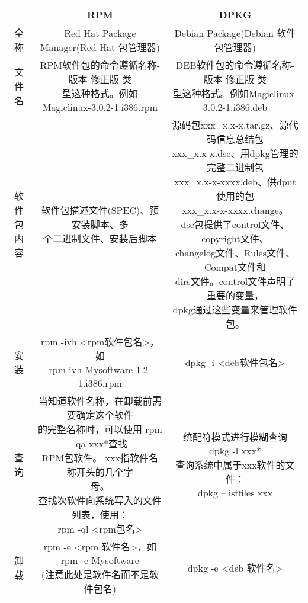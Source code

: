 \begin{center}
{\small
\begin{tabular}{c|c|c}
\hline
& RPM & DPKG\\
\hline
全称 & Red Hat Package Manager(Red Hat 包管理器)& Debian Package(Debian 软件包管理器)\\
\hline
文件名 &\tabincell{c}{RPM软件包的命令遵循名称-版本-修正版-类\\型这种格式。例如 Magiclinux-3.0.2-1.i386.rpm} & \tabincell{c}{DEB软件包的命令遵循名称-版本-修正版-类\\型这种格式。例如Magiclinux-3.0.2-1.i386.deb}\\
\hline
\tabincell{c}{软件包\\内容} & \tabincell{l}{软件包描述文件(SPEC)、预安装脚本、多\\个二进制文件、安装后脚本}&\tabincell{l}{源码包xxx\_x.x-x.tar.gz、源代码信息总结包\\xxx\_x.x-x.dsc、用dpkg管理的完整二进制包\\xxx\_x.x-x-xxxx.deb、供dput使用的包\\xxx\_x.x-x-xxxx.change。\\ dsc包提供了control文件、copyright文件、\\changelog文件、Rules文件、Compat文件和\\dirs文件。control文件声明了重要的变量，\\dpkg通过这些变量来管理软件包。}\\
\hline
安装 & \tabincell{l}{rpm -ivh <rpm软件包名>，如\\ rpm-ivh Mysoftware-1.2-1.i386.rpm} & dpkg -i <deb软件包名>\\
\hline
查询 & \tabincell{l}{当知道软件名称，在卸载前需要确定这个软件\\的完整名称时，可以使用
rpm -qa xxx*查找\\RPM包软件。 xxx指软件名称开头的几个字\\母。\\查找次软件向系统写入的文件列表，使用：\\ rpm -ql <rpm包名>} &
\tabincell{l}{统配符模式进行模糊查询\\ dpkg -l xxx* \\ 查询系统中属于xxx软件的文件：\\ dpkg --listfiles xxx}\\
\hline
卸载  & \tabincell{l}{rpm -e <rpm 软件名>，如 rpm -e Mysoftware\\(注意此处是软件名而不是软件包名)} &
dpkg -e <deb 软件名>\\
\hline
\end{tabular}}
\end{center} 


